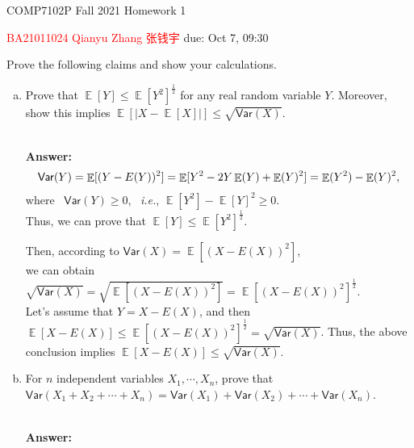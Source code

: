 \documentclass[12pt]{article}
\newcommand{\Answer}{\ \\ \textbf{Answer:} }
\DeclareMathOperator*{\E}{\mathbb{E}}
\newcommand{\Var}{\mathsf{Var}}
\def\ie{\textit{i.e.}\xspace}
\begin{document}
\noindent
\hspace*{.2in} COMP7102P Fall 2021
\hfill Homework 1\\
\begin{CJK}{UTF8}{gbsn}
\hspace*{.2in} \textcolor{red}{BA21011024 Qianyu Zhang 张钱宇} \hfill due: Oct 7, 09:30
\end{CJK}

\bigskip



\begin{problem}[30 points]
Prove the following claims and show your calculations.
\begin{enumerate}[(a)]
\item Prove that $\E[Y] \le \E[Y^2]^\frac{1}{2}$ for any real random variable $Y$. Moreover, show this implies $\E[|X - \E[X]|] \le \sqrt{\Var(X)}$.

\Answer
\begin{equation}
\begin{aligned}
\Var(Y) = \E[(Y - E(Y))^2] = \E[Y^2 - 2Y\E(Y) + \E(Y)^2] = \E(Y^2) - \E(Y)^2, \notag \\
\end{aligned}
\end{equation}
where \ $\Var(Y) \ge 0$, \ \ie,  $\E[Y^2] - \E[Y]^2 \ge 0$.   \\
Thus, we can prove that $\E[Y] \le \E[Y^2]^\frac{1}{2}$.

Then, according to $\Var(X) = \E[(X - E(X))^2]$, \\
we can obtain $\sqrt{\Var(X)} = \sqrt{\E[(X - E(X))^2]} = \E[(X - E(X))^2]^\frac{1}{2}$. \\
Let's assume that $Y = X - E(X)$, and then $\E[X - E(X)] \le \E[(X - E(X))^2]^\frac{1}{2} = \sqrt{\Var(X)}$.
Thus, the above conclusion implies $\E[X - E(X)] \le \sqrt{\Var(X)}$.


\item For $n$ independent variables $X_1, \cdots, X_n$, prove that $\Var(X_1 + X_2 + \cdots + X_n) = \Var(X_1) + \Var(X_2) + \cdots + \Var(X_n)$.

\Answer


\end{enumerate}
\end{problem}
\end{document}
